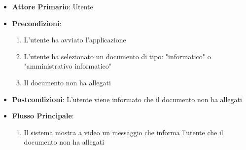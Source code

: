 \begin{itemize}
    \item \textbf{Attore Primario}: Utente
    \item \textbf{Precondizioni}:
    \begin{enumerate}
        \item L'utente ha avviato l'applicazione
        \item L'utente ha selezionato un documento di tipo: "informatico" o "amministrativo informatico"
        \item Il documento non ha allegati
    \end{enumerate}
    \item \textbf{Postcondizioni}: L'utente viene informato che il documento non ha allegati
    \item \textbf{Flusso Principale}:
    \begin{enumerate}
        \item Il sistema mostra a video un messaggio che informa l'utente che il documento non ha allegati
    \end{enumerate}
\end{itemize}

